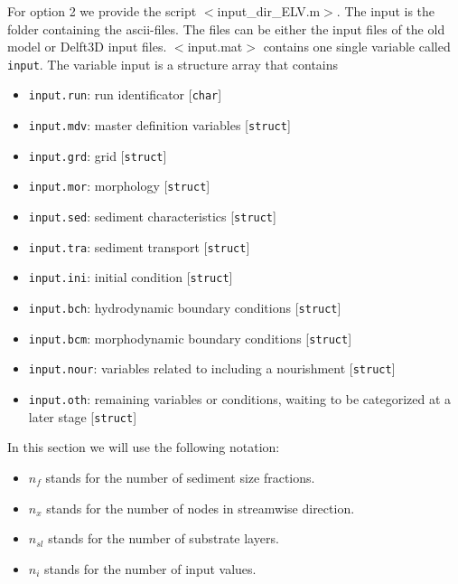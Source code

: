 \documentclass[a4paper, 11pt]{article}
\newcommand{\pathfile}[1]{$<$#1$>$}
\begin{document}
For option 2 we provide the script \pathfile{input\_dir\_ELV.m}. The input is the folder containing the ascii-files. The files can be either the input files of the old model or Delft3D input files.
%
\label{subsec:input_structure}
%
\pathfile{input.mat} contains one single variable called \texttt{input}. The variable input is a structure array that contains
\begin{itemize}
\item \texttt{input.run}: run identificator [\texttt{char}]
\item \texttt{input.mdv}: master definition variables [\texttt{struct}]
\item \texttt{input.grd}: grid [\texttt{struct}]
\item \texttt{input.mor}: morphology [\texttt{struct}]
\item \texttt{input.sed}: sediment characteristics [\texttt{struct}]
\item \texttt{input.tra}: sediment transport [\texttt{struct}]
\item \texttt{input.ini}: initial condition [\texttt{struct}]
\item \texttt{input.bch}: hydrodynamic boundary conditions [\texttt{struct}]
\item \texttt{input.bcm}: morphodynamic boundary conditions [\texttt{struct}]
\item \texttt{input.nour}: variables related to including a nourishment [\texttt{struct}]
\item \texttt{input.oth}: remaining variables or conditions, waiting to be categorized at a later stage [\texttt{struct}]
\end{itemize}

In this section we will use the following notation:
\begin{itemize}
\item $n_f$ stands for the number of sediment size fractions.
\item $n_x$ stands for the number of nodes in streamwise direction. 
\item $n_{sl}$ stands for the number of substrate layers.
\item $n_i$ stands for the number of input values.
\end{itemize}
%
\end{document}

